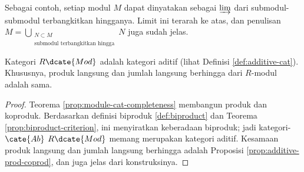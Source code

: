 Sebagai contoh, setiap modul $M$ dapat dinyatakan sebagai $\varinjlim$ dari submodul-submodul terbangkitkan hingganya. Limit ini terarah ke atas, dan penulisan $M = \bigcup_{\substack{N \subset M \\ \text{submodul terbangkitkan hingga}}} N$ juga sudah jelas.

\begin{corollary}\label{prop:Mod-cat-additive}
	Kategori $R\dcate{Mod}$ adalah kategori aditif (lihat Definisi \ref{def:additive-cat}). Khususnya, produk langsung dan jumlah langsung berhingga dari $R$-modul adalah sama.
\end{corollary}
\begin{proof}
	Teorema \ref{prop:module-cat-completeness} membangun produk dan koproduk. Berdasarkan definisi biproduk \ref{def:biproduct} dan Teorema \ref{prop:biproduct-criterion}, ini menyiratkan keberadaan biproduk; jadi kategori-$\cate{Ab}$ $R\dcate{Mod}$ memang merupakan kategori aditif. Kesamaan produk langsung dan jumlah langsung berhingga adalah Proposisi \ref{prop:additive-prod-coprod}, dan juga jelas dari konstruksinya.
\end{proof}

